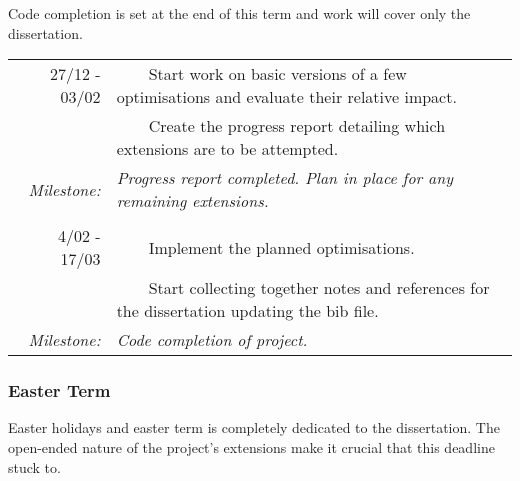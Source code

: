 \documentclass[12pt,a4paper, headings=standardclasses]{scrartcl}
\newcommand{\tabitem}{~~\llap{\textbullet}~~}
\begin{document}
Code completion is set at the end of this term and work will cover only the dissertation.

\begin{tabularx}{\textwidth}{rX} \toprule
      27/12 - 03/02
       & \tabitem Start work on basic versions of a few optimisations and evaluate their relative impact.    \\
       & \tabitem Create the progress report detailing which extensions are to be attempted.                 \\
      \textit{Milestone:}
       & \textit{Progress report completed. Plan in place for any remaining extensions.}                     \\
      \\

      4/02 - 17/03
       & \tabitem Implement the planned optimisations.                                                       \\
       & \tabitem Start collecting together notes and references for the dissertation updating the bib file. \\
      \textit{Milestone:}
       & \textit{Code completion of project.}                                                                \\
      \bottomrule
\end{tabularx}

\subsubsection*{Easter Term}

Easter holidays and easter term is completely dedicated to the dissertation.
The open-ended nature of the project's extensions make it crucial that this
deadline stuck to.
\end{document}
